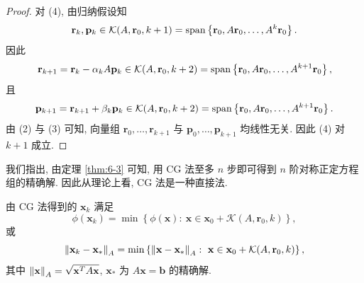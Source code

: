 \begin{proof}
对 (4), 由归纳假设知
\[
  \mathbf{r}_k,\mathbf{p}_k\in\mathcal{K}(A,\mathbf{r}_0,k+1)
  =\operatorname{span}\left\{\mathbf{r}_0,A\mathbf{r}_0,\ldots,A^k\mathbf{r}_0\right\}.
\]
因此
\[
  \mathbf{r}_{k+1}=\mathbf{r}_k-\alpha_kA\mathbf{p}_k
  \in\mathcal{K}(A,\mathbf{r}_0,k+2)
  =\operatorname{span}\left\{\mathbf{r}_0,A\mathbf{r}_0,\ldots,A^{k+1}\mathbf{r}_0\right\},
\]
且
\[
  \mathbf{p}_{k+1}=\mathbf{r}_{k+1}+\beta_k\mathbf{p}_k
  \in\mathcal{K}(A,\mathbf{r}_0,k+2)
  =\operatorname{span}\left\{\mathbf{r}_0,A\mathbf{r}_0,\ldots,A^{k+1}\mathbf{r}_0\right\}.
\]
由 (2) 与 (3) 可知, 向量组 $\mathbf{r}_0,\ldots,\mathbf{r}_{k+1}$ 与 $\mathbf{p}_0,\ldots,\mathbf{p}_{k+1}$ 均线性无关. 因此 (4) 对 $k+1$ 成立.
\end{proof}

我们指出, 由定理 \ref{thm:6-3} 可知, 用 CG 法至多 $n$ 步即可得到 $n$ 阶对称正定方程组的精确解. 因此从理论上看, CG 法是一种直接法.

\begin{theorem}
\label{thm:6-4}
由 CG 法得到的 $\mathbf{x}_k$ 满足
\begin{equation}
  \phi(\mathbf{x}_k)=\min\left\{\phi(\mathbf{x}):
  \ \mathbf{x}\in\mathbf{x}_0+\mathcal{K}(A,\mathbf{r}_0,k)\right\},
  \label{eq:6-8}
\end{equation}
或
\begin{equation}
  \left\|\mathbf{x}_k-\mathbf{x}_*\right\|_A
  =\min\left\{\left\|\mathbf{x}-\mathbf{x}_*\right\|_A:
  \ \mathbf{x}\in\mathbf{x}_0+\mathcal{K}(A,\mathbf{r}_0,k)\right\},
  \label{eq:6-9}
\end{equation}
其中 $\left\|\mathbf{x}\right\|_A=\sqrt{\mathbf{x}^TA\mathbf{x}}$, $\mathbf{x}_*$ 为 $A\mathbf{x}=\mathbf{b}$ 的精确解.
\end{theorem}

